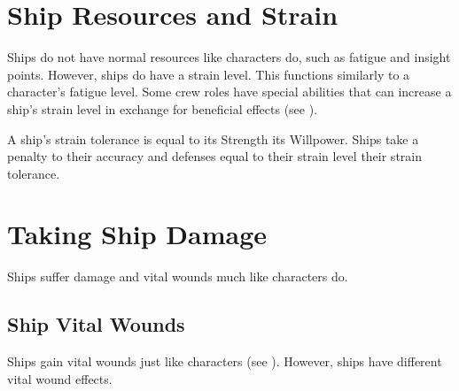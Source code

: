 \section{Ship Resources and Strain}
    Ships do not have normal resources like characters do, such as fatigue and insight points.
    However, ships do have a strain level.
    This functions similarly to a character's fatigue level.
    Some crew roles have special abilities that can increase a ship's strain level in exchange for beneficial effects (see ).

    A ship's strain tolerance is equal to its Strength \add its Willpower.
    Ships take a penalty to their accuracy and defenses equal to their strain level \sub their strain tolerance.

\section{Taking Ship Damage}
    Ships suffer damage and vital wounds much like characters do.

    \subsection{Ship Vital Wounds}
        Ships gain vital wounds just like characters (see ).
        However, ships have different vital wound effects.

